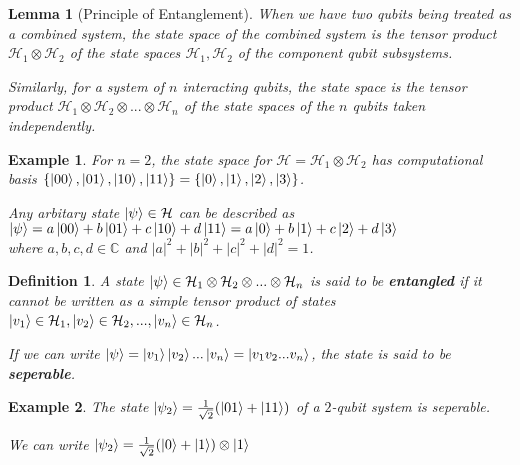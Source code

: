 \documentclass[12pt,twoside,fleqn]{report}
\theoremstyle{thmstyle}
\newtheorem{defn}{Definition}[chapter]
\newtheorem{eg}{Example}[chapter]
\newtheorem{lemma}{Lemma}[chapter]
\begin{document}
\begin{samepage}
    \begin{mdframed}
\begin{lemma}[Principle of Entanglement]
When we have two qubits being treated as a combined system, the state space of the combined system is the tensor product $\mathcal{H}_1 \otimes \mathcal{H}_2$ of the state spaces $\mathcal{H}_1, \mathcal{H}_2$ of the component qubit subsystems. 

    Similarly, for a system of $n$ interacting qubits, the state space is the tensor product $\mathcal{H}_1 \otimes \mathcal{H}_2 \otimes ... \otimes \mathcal{H}_n$ of the state spaces of the $n$ qubits taken independently.
\end{lemma}
    \end{mdframed}
\end{samepage}

\begin{eg}
For $n=2$, the state space for $\mathcal{H} = \mathcal{H}_1 \otimes \mathcal{H}_2$ has computational basis $\{ \ket{00}, \ket{01}, \ket{10}, \ket{11} \} = \{ \ket{0}, \ket{1}, \ket{2}, \ket{3} \}$.

    Any arbitary state $\ket{\psi} \in \mathcal{H}$ can be described as $\ket{\psi} = a \ket{00} + b \ket{01} + c \ket{10} + d \ket{11} = a \ket{0} + b \ket{1} + c \ket{2} + d \ket{3}$ \\ where $a, b, c, d \in \mathbb{C}$ and $|a|^2 + |b|^2 + |c|^2 + |d|^2 = 1$.
\end{eg}


\begin{defn}
    A state $\ket{\psi} \in \mathcal{H}_1 \otimes \mathcal{H}_2 \otimes ... \otimes \mathcal{H}_n$ is said to be \textbf{entangled} if it cannot be written as a simple tensor product of states $\ket{v_1} \in \mathcal{H}_1, \ket{v_2} \in \mathcal{H}_2, ..., \ket{v_n} \in \mathcal{H}_n$. 

    If we can write $\ket{\psi} = \ket{v_1}\ket{v_2}...\ket{v_n} = \ket{v_1 v_2...v_n}$, the state is said to be \textbf{seperable}.
\end{defn}

\begin{eg}
The state $\ket{\psi_2} = \frac{1}{\sqrt{2}} (\ket{01} + \ket{11})$ of a $2$-qubit system is seperable. 

We can write $\ket{\psi_2} = \frac{1}{\sqrt{2}} (\ket{0} + \ket{1}) \otimes \ket{1}$
\end{eg}
\end{document}
